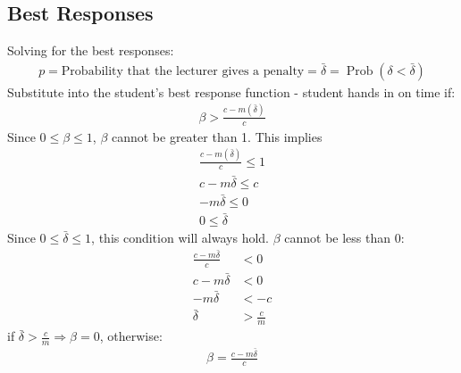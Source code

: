 \documentclass[11pt,preprint, authoryear]{elsarticle}
\numberwithin{equation}{section}
\numberwithin{figure}{section}
\numberwithin{table}{section}
\begin{document}
\hypertarget{best-responses}{%
\subsection*{\texorpdfstring{Best Responses
\label{br}}{Best Responses }}\label{best-responses}}

Solving for the best responses: \begin{align*}
p=\text{Probability that the lecturer gives a penalty} = \bar{\delta}=\operatorname{Prob}(\delta<\bar{\delta})
\end{align*} Substitute into the student's best response function -
student hands in on time if: \begin{align*}{}
\beta>\frac{c-m(\bar{\delta})}{c}
\end{align*}{} Since \(0 \leq \beta \leq 1\), \(\beta\) cannot be
greater than 1. This implies \begin{align*}{}
\frac{c-m(\bar{\delta})}{c} \leq 1 \\
c-m \bar{\delta} \leq c \\
-m \bar{\delta} \leq 0 \\
0 \leq \bar{\delta}
\end{align*}{} Since \(0 \leq \bar{\delta} \leq 1\), this condition will
always hold. \(\beta\) cannot be less than 0: \begin{align*}
\frac{c-m \bar{\delta}}{c}&<0 \\
c-m \bar{\delta}&<0 \\
-m \bar{\delta}&< -c \\
\bar{\delta}&>\frac{c}{m}
\end{align*} if \(\bar{\delta}>\frac{c}{m} \Rightarrow \beta=0\),
otherwise: \begin{align*}
\beta =\frac{c-m \bar{\delta}}{c}
\end{align*}


\end{document}
